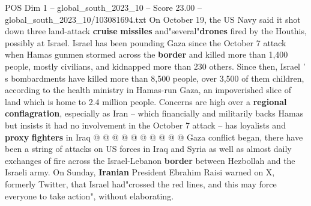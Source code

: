 \begin{textsample}{POS Dim 1 – global\_south\_2023\_10 – Score 23.00 – global\_south\_2023\_10/103081694.txt}
On October 19, the US Navy said it shot down three land-attack \textbf{cruise} \textbf{missiles} and"several"\textbf{drones} fired by the Houthis, possibly at Israel.
Israel has been pounding Gaza since the October 7 attack when Hamas gunmen stormed across the \textbf{border} and killed more than 1,400 people, mostly civilians, and kidnapped more than 230 others.
Since then, Israel ' s bombardments have killed more than 8,500 people, over 3,500 of them children, according to the health ministry in Hamas-run Gaza, an impoverished slice of land which is home to 2.4 million people.
Concerns are high over a \textbf{regional} \textbf{conflagration}, especially as Iran -- which financially and militarily backs Hamas but insists it had no involvement in the October 7 attack -- has loyalists and \textbf{proxy} \textbf{fighters} in Iraq @ @ @ @ @ @ @ @ @ @ Gaza conflict began, there have been a string of attacks on US forces in Iraq and Syria as well as almost daily exchanges of fire across the Israel-Lebanon \textbf{border} between Hezbollah and the Israeli army.
On Sunday, \textbf{Iranian} President Ebrahim Raisi warned on X, formerly Twitter, that Israel had"crossed the red lines, and this may force everyone to take action", without elaborating.

\end{textsample}
